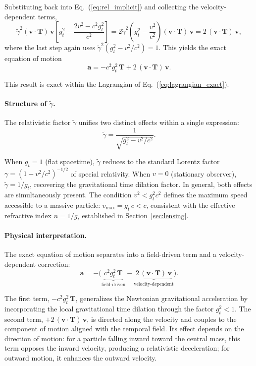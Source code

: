 \documentclass[12pt]{article}
\begin{document}
Substituting back into Eq.~(\ref{eq:rel_implicit}) and collecting the velocity-dependent terms,
$$
\tilde{\gamma}^2(\mathbf{v}\cdot\mathbf{T})\,\mathbf{v}
\left[g_t^2 - \frac{2v^2 - c^2 g_t^2}{c^2}\right]
= 2\tilde{\gamma}^2\!\left(g_t^2 - \frac{v^2}{c^2}\right)
  (\mathbf{v}\cdot\mathbf{T})\,\mathbf{v}
= 2\,(\mathbf{v}\cdot\mathbf{T})\,\mathbf{v} ,
$$
where the last step again uses $\tilde{\gamma}^2(g_t^2 - v^2/c^2) = 1$. This yields the exact equation of motion
\begin{equation}
\mathbf{a} = -c^2 g_t^2\,\mathbf{T}
            + 2\,(\mathbf{v}\cdot\mathbf{T})\,\mathbf{v} .
\label{eq:eom_exact}
\end{equation}

This result is exact within the Lagrangian of Eq.~(\ref{eq:lagrangian_exact}).

\paragraph{Structure of $\tilde{\gamma}$.}
The relativistic factor $\tilde{\gamma}$ unifies two distinct effects within a single expression:
$$
\tilde{\gamma}
= \frac{1}{\sqrt{g_t^2 - v^2/c^2}} .
$$

When $g_t = 1$ (flat spacetime), $\tilde{\gamma}$ reduces to the standard Lorentz factor $\gamma = (1 - v^2/c^2)^{-1/2}$ of special relativity. When $v = 0$ (stationary observer), $\tilde{\gamma} = 1/g_t$, recovering the gravitational time dilation factor. In general, both effects are simultaneously present. The condition $v^2 < g_t^2 c^2$ defines the maximum speed accessible to a massive particle: $v_{\max} = g_t\, c < c$, consistent with the effective refractive index $n = 1/g_t$ established in Section~\ref{sec:lensing}.

\paragraph{Physical interpretation.}
The exact equation of motion separates into a field-driven term and a velocity-dependent correction:
$$
\mathbf{a} = -\Big(\underbrace{c^2 g_t^2\,\mathbf{T}}_{\text{field-driven}}
  - \underbrace{2\,(\mathbf{v}\cdot\mathbf{T})\,\mathbf{v}}_{\text{velocity-dependent}}\Big) .
$$

The first term, $-c^2 g_t^2\,\mathbf{T}$, generalizes the Newtonian gravitational acceleration by incorporating the local gravitational time dilation through the factor $g_t^2 < 1$. The second term, $+2\,(\mathbf{v}\cdot\mathbf{T})\,\mathbf{v}$, is directed along the velocity and couples to the component of motion aligned with the temporal field. Its effect depends on the direction of motion: for a particle falling inward toward the central mass, this term opposes the inward velocity, producing a relativistic deceleration; for outward motion, it enhances the outward velocity.
\end{document}
